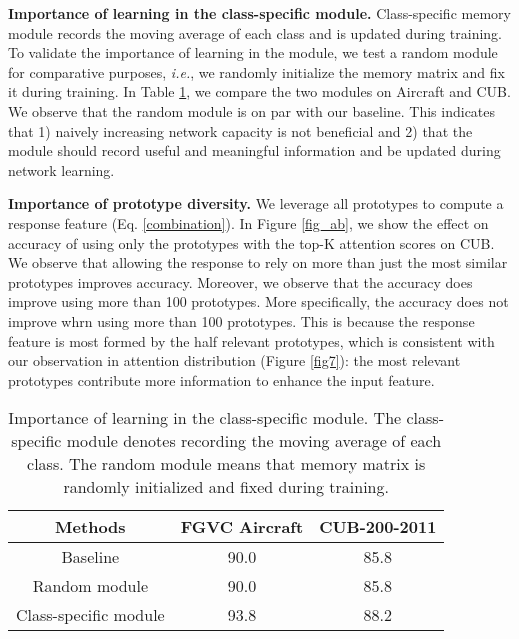 \documentclass[journal]{IEEEtran}
\begin{document}
\textbf{Importance of learning in the class-specific module.} Class-specific memory module records the moving average of each class and is updated during training. To validate the importance of learning in the module, we test a random module for comparative purposes, \emph{i.e.}, we randomly initialize the memory matrix and fix it during training. In Table \ref{table5}, we compare the two modules on Aircraft and CUB. We observe that the random module is on par with our baseline. This indicates that 1) naively increasing network capacity is not beneficial and 2) that the module should record useful and meaningful information and be updated during network learning.

\textbf{Importance of prototype diversity.} 
We leverage all prototypes to compute a response feature (Eq. \ref{combination}). In Figure \ref{fig_ab}, we show the effect on accuracy of using only the prototypes with the top-K attention scores on CUB. We observe that allowing the response to rely on more than just the most similar prototypes improves accuracy. 
Moreover, we observe that the accuracy does improve using more than 100 prototypes. More specifically, the accuracy does not improve whrn using more than 100 prototypes. This is because the response feature is most formed by the half relevant prototypes, which is consistent with our observation in attention distribution (Figure \ref{fig7}): the most relevant prototypes contribute more information to enhance the input feature.
\setlength{\tabcolsep}{8pt}
\begin{table}[!t]
\caption{Importance of learning in the class-specific module. The class-specific module denotes recording the moving average of each class. The random module means that memory matrix is randomly initialized and fixed during training.}
    \small
    \begin{center}
    \begin{tabular}{|c|c|c|}
    \hline
    Methods & FGVC Aircraft & CUB-200-2011  \\
    \hline
    \hline
    Baseline & 90.0 & 85.8 \\
    \hline
    Random module & 90.0 & 85.8 \\
    \hline
    \rowcolor{mygray} {Class-specific module} & {93.8} & {88.2}\\
    \hline
    \end{tabular}
    \end{center}

 \label{table5}
\end{table}
\end{document}
